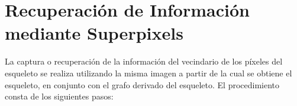 \label{chap:apendice}

\section{Recuperaci\'on de Informaci\'on mediante Superpixels}
\label{sec:superpixels}

La captura o recuperaci\'on de la informaci\'on del vecindario de los p\'ixeles del esqueleto se realiza utilizando la misma imagen a partir de la cual se obtiene el esqueleto, en conjunto con el grafo derivado del esqueleto. El procedimiento consta de los siguientes pasos:



